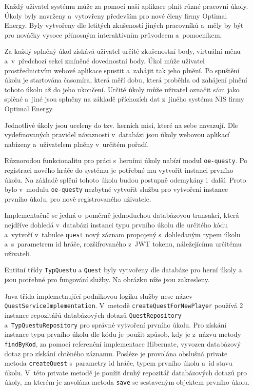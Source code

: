 \documentclass[twoside, 12pt]{article}
\begin{document}
{\clearpage


Každý uživatel systému může za pomocí naší aplikace plnit různé pracovní úkoly.
Úkoly byly navrženy a~vytovřeny především pro nové členy firmy Optimal Energy.
Byly vytvořeny dle letitých zkušeností jiných pracovníků
a~měly by být pro nováčky vysoce přínosným interaktivním průvodcem a~pomocníkem.

Za každý splněný úkol získává užívatel určité zkušenostní body,
virtuální měnu a~v~předchozí sekci zmíněné dovednostní body.
Úkol může uživatel prostřednictvím webové aplikace spustit a~zahájit tak jeho plnění.
Po spuštění úkolu je startována časomíra, která měří dobu,
která proběhla od zahájení plnění tohoto úkolu až do jeho ukončení.
Určité úkoly může uživatel označit sám jako splěné
a~jiné jsou splněny na základě příchozích dat z~jiného systému NIS firmy Optimal Energy.

Jednotlivé úkoly jsou uceleny do tzv. herních misí, které na sebe navazují.
Dle vydefinovaných pravidel návazností v~databázi jsou úkoly webovou aplikací nabízeny
a~uživatelem plněny v~určitém pořadí.

Různorodou funkcionalitu pro práci s~herními úkoly nabízí modul \texttt{oe-questy}.
Po registraci nového hráče do systému je potřebné mu vytvořit instanci prvního úkolu.
Na základě splění tohoto úkolu budou postupně odemykány i~další.
Proto bylo v~modulu \texttt{oe-questy} nezbytné vytvořit službu pro vytvoření instance prvního úkolu,
pro nově registrovaného uživatele.

Implementačně se jedná o~poměrně jednoduchou databázovou transakci,
která nejdříve dohledá v~databázi instanci typu prvního úkolu dle určitého kódu a~vytvoří v~tabulce \texttt{quest}
nový záznam propojený s~dohledaným typem úkolu a~s~parametrem id hráče,
rozšifrovaného z~JWT tokenu, náležejícímu určitému uživateli.


Entitní třídy \texttt{TypQuestu} a \texttt{Quest} byly vytvořeny dle databáze pro herní úkoly a
jsou potřebné pro fungování služby. Na obrázku níže jsou zakresleny.

\obrazek
{}

\clearpage

Java třída implemetnující podnikovou logiku služby nese název \texttt{QuestServiceImplementation}.
V~metodě \texttt{createQuestForNewPlayer} používá 2 instance repozitářů databázových dotazů
\texttt{QuestRepository} a~\texttt{TypQuestuRepository} pro správné vytvoření prvního úkolu.
Pro získání instance typu prvního úkolu dle kódu je použit způsob, kdy je z~názvu metody \texttt{findByKod},
za pomocí referenční implementace Hibernate, vyvozen databázový dotaz pro získání chtěného záznamu.
Posléze je provolána obslušná private metoda \texttt{createQuest} s~parametry id hráče, typem prvního úkolu
a~id stavu úkolu.
V~této private metodě je použit druhý repozitář databázových dotazů pro úkoly,
na kterém je zavolána metoda \texttt{save} se sestaveným objektem prvního úkolu.

}
\end{document}
